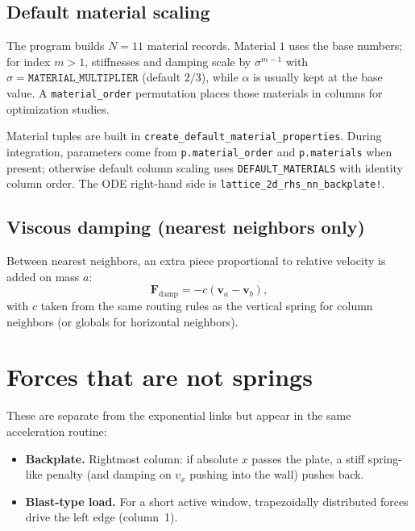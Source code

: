 \documentclass[11pt,a4paper]{article}
\begin{document}
\subsection{Default material scaling}
The program builds $N=11$ material records. Material $1$ uses the base numbers; for index $m>1$, stiffnesses and damping scale by $\sigma^{m-1}$ with $\sigma=\texttt{MATERIAL\_MULTIPLIER}$ (default $2/3$), while $\alpha$ is usually kept at the base value. A \texttt{material\_order} permutation places those materials in columns for optimization studies.

\begin{codebox}
Material tuples are built in \texttt{create\_default\_material\_properties}. During integration, parameters come from \texttt{p.material\_order} and \texttt{p.materials} when present; otherwise default column scaling uses \texttt{DEFAULT\_MATERIALS} with identity column order. The ODE right-hand side is \texttt{lattice\_2d\_rhs\_nn\_backplate!}.
\end{codebox}

\subsection{Viscous damping (nearest neighbors only)}
Between nearest neighbors, an extra piece proportional to relative velocity is added on mass $a$:
\begin{equation}
\mathbf{F}_{\mathrm{damp}} = -c\left(\mathbf{v}_a-\mathbf{v}_b\right),
\end{equation}
with $c$ taken from the same routing rules as the vertical spring for column neighbors (or globals for horizontal neighbors).

\section{Forces that are not springs}
These are separate from the exponential links but appear in the same acceleration routine:
\begin{itemize}
  \item \textbf{Backplate.} Rightmost column: if absolute $x$ passes the plate, a stiff spring-like penalty (and damping on $v_x$ pushing into the wall) pushes back.
  \item \textbf{Blast-type load.} For a short active window, trapezoidally distributed forces drive the left edge (column~1).
\end{itemize}
\end{document}
